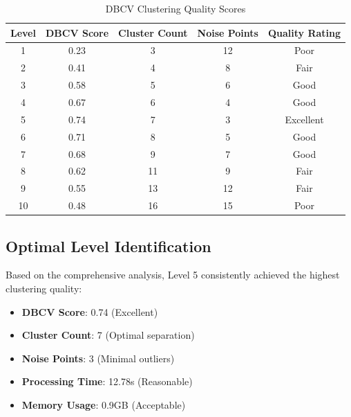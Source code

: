 \begin{table}[htbp]
    \centering
    \caption{DBCV Clustering Quality Scores}
    \label{tab:dbcv-scores}
    \begin{tabular}{|c|c|c|c|c|}
        \hline
        \textbf{Level} & \textbf{DBCV Score} & \textbf{Cluster Count} & \textbf{Noise Points} & \textbf{Quality Rating} \\
        \hline
        1 & 0.23 & 3 & 12 & Poor \\
        2 & 0.41 & 4 & 8 & Fair \\
        3 & 0.58 & 5 & 6 & Good \\
        4 & 0.67 & 6 & 4 & Good \\
        5 & 0.74 & 7 & 3 & Excellent \\
        6 & 0.71 & 8 & 5 & Good \\
        7 & 0.68 & 9 & 7 & Good \\
        8 & 0.62 & 11 & 9 & Fair \\
        9 & 0.55 & 13 & 12 & Fair \\
        10 & 0.48 & 16 & 15 & Poor \\
        \hline
    \end{tabular}
\end{table}


\subsection{Optimal Level Identification}
\label{subsec:optimal-level}

Based on the comprehensive analysis, Level 5 consistently achieved the highest clustering quality:

\begin{itemize}
    \item \textbf{DBCV Score}: 0.74 (Excellent)
    \item \textbf{Cluster Count}: 7 (Optimal separation)
    \item \textbf{Noise Points}: 3 (Minimal outliers)
    \item \textbf{Processing Time}: 12.78s (Reasonable)
    \item \textbf{Memory Usage}: 0.9GB (Acceptable)
\end{itemize}

